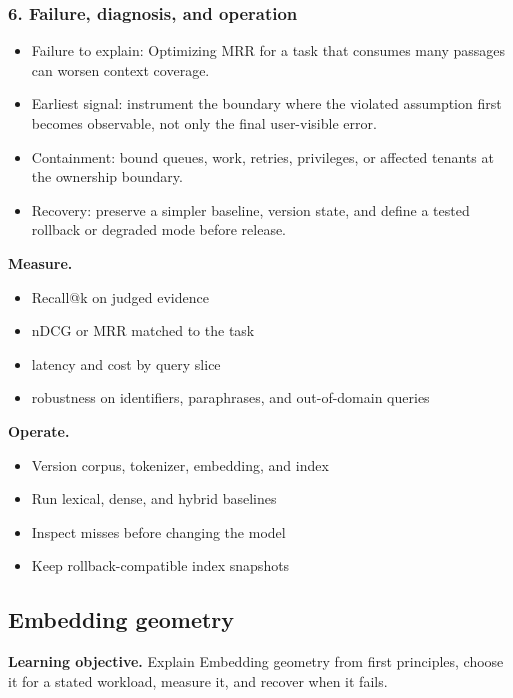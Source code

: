 \subsubsection*{6. Failure, diagnosis, and operation}
\begin{itemize}
\item Failure to explain: Optimizing MRR for a task that consumes many passages can worsen context coverage.
\item Earliest signal: instrument the boundary where the violated assumption first becomes observable, not only the final user-visible error.
\item Containment: bound queues, work, retries, privileges, or affected tenants at the ownership boundary.
\item Recovery: preserve a simpler baseline, version state, and define a tested rollback or degraded mode before release.
\end{itemize}
\textbf{Measure.}\begin{itemize}
\item Recall@k on judged evidence
\item nDCG or MRR matched to the task
\item latency and cost by query slice
\item robustness on identifiers, paraphrases, and out-of-domain queries
\end{itemize}
\textbf{Operate.}\begin{itemize}
\item Version corpus, tokenizer, embedding, and index
\item Run lexical, dense, and hybrid baselines
\item Inspect misses before changing the model
\item Keep rollback-compatible index snapshots
\end{itemize}
\subsection{Embedding geometry}
\textbf{Learning objective.} Explain Embedding geometry from first principles, choose it for a stated workload, measure it, and recover when it fails.
